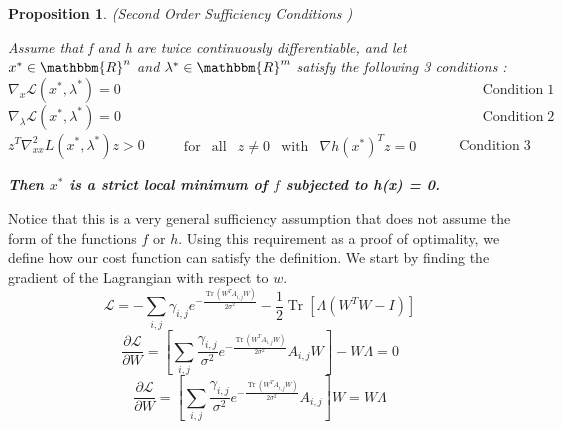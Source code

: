 \documentclass{article}
\newcommand{\tmop}[1]{\ensuremath{\operatorname{#1}}}
\newcommand{\tmtextbf}[1]{{\bfseries{#1}}}
\newtheorem{proposition}{Proposition}
\begin{document}
\begin{proposition}
  (Second Order Sufficiency Conditions )
  
  Assume that f and h are twice continuously differentiable, and let
  $x^{\ast} \in \mathbbm{R}^n$ and $\lambda^{\ast} \in \mathbbm{R}^m$ satisfy
  the following 3 conditions :
  \[ \nabla_x \mathcal{L} ( x^{\ast}, \lambda^{\ast}) = 0
     \begin{array}{llllllllllllllllllllllllllllllll}
       &  &  &  &  &  &  &  &  &  &  &  &  &  &  &  &  &  &  &  &  &  &  &  &
       &  &  &  &  &  &  & 
     \end{array} \tmop{Condition} 1 \]
  \[ \nabla_{\lambda} \mathcal{L} ( x^{\ast}, \lambda^{\ast}) = 0
     \begin{array}{llllllllllllllllllllllllllllllll}
       &  &  &  &  &  &  &  &  &  &  &  &  &  &  &  &  &  &  &  &  &  &  &  &
       &  &  &  &  &  &  & 
     \end{array} \tmop{Condition} 2 \]
  \[ z^T \nabla_{x x}^2 L ( x^{\ast}, \lambda^{\ast}) z > 0
     \begin{array}{llllllll}
       &  &  & \tmop{for} & \tmop{all} & z \neq 0 & \tmop{with} & \nabla h (
       x^{\ast})^T z = 0
     \end{array} \begin{array}{lll}
       &  & 
     \end{array} \tmop{Condition} 3 \]
  
  
  \tmtextbf{Then $x^{\ast}$ is a strict local minimum of $f$ subjected to h(x)
  = 0.}
\end{proposition}



Notice that this is a very general sufficiency assumption that does not assume
the form of the functions $f$ or $h$. Using this requirement as a proof of
optimality, we define how our cost function can satisfy the definition. We
start by finding the gradient of the Lagrangian with respect to $w$.
\[ \mathcal{L} = - \sum_{i, j} \gamma_{i, j} e^{- \frac{\tmop{Tr} ( W^T A_{i,
   j} W)}{2 \sigma^2}} - \frac{1}{2} \tmop{Tr} [ \Lambda (W^T W - I)] \]
\[ \frac{\partial \mathcal{L}}{\partial W} = \left[ \sum_{i, j}
   \frac{\gamma_{i, j}}{\sigma^2} e^{- \frac{\tmop{Tr} ( W^T A_{i, j} W)}{2
   \sigma^2}} A_{i, j} W \right] - W \Lambda = 0 \]
\[ \frac{\partial \mathcal{L}}{\partial W} = \left[ \sum_{i, j}
   \frac{\gamma_{i, j}}{\sigma^2} e^{- \frac{\tmop{Tr} ( W^T A_{i, j} W)}{2
   \sigma^2}} A_{i, j}  \right] W = W \Lambda \]
\end{document}
